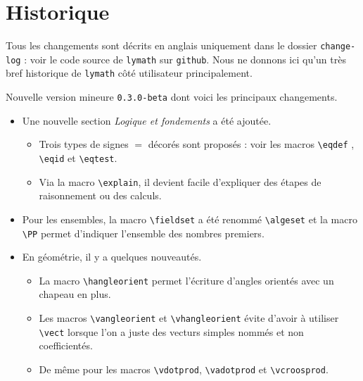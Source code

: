 \documentclass[12pt,a4paper]{article}
\begin{document}
\newpage

\section{Historique}

Tous les changements sont décrits en anglais uniquement dans le dossier \verb+change-log+ : voir le code source de \verb+lymath+ sur \verb+github+. Nous ne donnons ici qu'un très bref historique de \verb+lymath+ côté utilisateur principalement.

\begin{description}[leftmargin=1em]
	\setlength\itemsep{1em}


	\item[2019-07-23] Nouvelle version mineure \verb+0.3.0-beta+ dont voici les principaux changements.
	\begin{itemize}
		\item Une nouvelle section \emph{\og Logique et fondements \fg} a été ajoutée.
		\begin{itemize}
			\item Trois types de signes $=$ décorés sont proposés : voir les macros \verb+\eqdef+ , \verb+\eqid+ et \verb+\eqtest+.

			\item Via la macro \verb+\explain+, il devient facile d'expliquer des étapes de raisonnement ou des calculs.
		\end{itemize}

		\item Pour les ensembles, la macro \verb+\fieldset+ a été renommé \verb+\algeset+ et la macro \verb+\PP+ permet d'indiquer l'ensemble des nombres premiers.

		\item En géométrie, il y a quelques nouveautés.
		\begin{itemize}
			\item La macro \verb+\hangleorient+ permet l'écriture d'angles orientés avec un chapeau en plus.

			\item Les macros \verb+\vangleorient+ et \verb+\vhangleorient+ évite d'avoir à utiliser \verb+\vect+ lorsque l'on a juste des vecturs simples nommés et non coefficientés.

			\item De même pour les macros \verb+\vdotprod+, \verb+\vadotprod+ et \verb+\vcroosprod+.
		\end{itemize}


\end{itemize}
\end{description}
\end{document}
